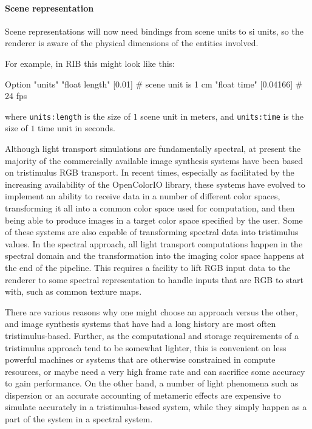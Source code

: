 \paragraph{Scene representation}

Scene representations will now need bindings from scene units to \gls{si} units,
so the renderer is aware of the physical dimensions of the entities involved.

For example, in \gls{RIB} this might look like this:

\begin{ribcode}
	Option "units" "float length" [0.01]    # scene unit is 1 cm
	"float time"   [0.04166] # 24 fps
\end{ribcode}
where \Verb/units:length/ is the size of $1$ scene unit in meters,
and \Verb/units:time/ is the size of $1$ time unit in seconds.

Although light transport simulations are fundamentally spectral, at present
the majority of the commercially available image synthesis systems have been
based on tristimulus \gls{RGB} transport.
In recent times, especially as facilitated by the increasing availability of the
OpenColorIO library, these systems have evolved to implement an ability to receive
data in a number of different color spaces, transforming it all into a common
color space used for computation, and then being able to produce images in a
target color space specified by the user. Some of these systems are also
capable of transforming spectral data into tristimulus values.
In the spectral approach, all light transport computations happen in the
spectral domain and the transformation into the imaging color space
happens at the end of the pipeline. This requires a facility to lift \gls{RGB}
input data to the renderer to some spectral representation to handle inputs
that are \gls{RGB} to start with, such as common texture maps.

There are various reasons why one might choose an approach versus the other,
and image synthesis systems that have had a long history are most often
tristimulus-based. Further, as the computational and storage requirements
of a tristimulus approach tend to be somewhat lighter, this is convenient on
less powerful machines or systems that are otherwise constrained in compute
resources, or maybe need a very high frame rate and can
sacrifice some accuracy to gain performance. On the other
hand, a number of light phenomena such as dispersion or an accurate accounting
of metameric effects are expensive to simulate accurately in a tristimulus-based
system, while they simply happen as a part of the system in a spectral system.

